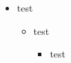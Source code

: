 \documentclass{beamer}
\begin{document}
	
\begin{frame}
	\begin{itemize}
  \item<myalert@1> test
  	\begin{itemize}
    \item test
      \begin{itemize}
      \item<myalert@1> test
      \end{itemize}
    \end{itemize}
  \end{itemize}  
\end{frame}	
	
\end{document}
